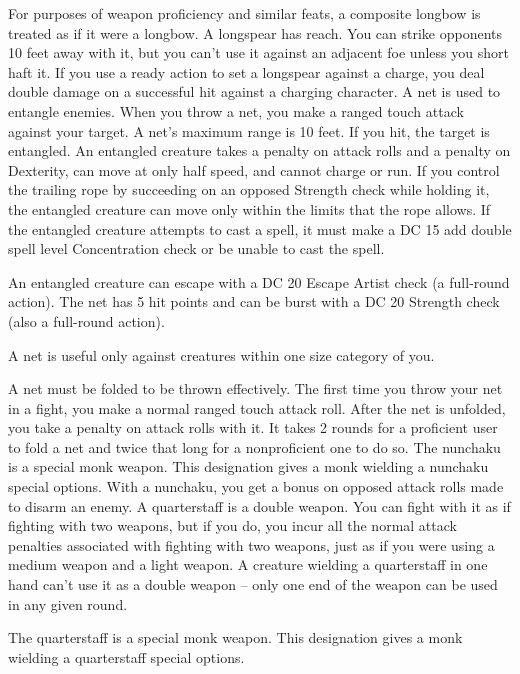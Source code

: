 \par For purposes of weapon proficiency and similar feats, a composite longbow is treated as if it were a longbow.
 A longspear has reach. You can strike opponents 10 feet away with it, but you can't use it against an adjacent foe unless you short haft it. If you use a ready action to set a longspear against a charge, you deal double damage on a successful hit against a charging character.
 A net is used to entangle enemies. When you throw a net, you make a ranged touch attack against your target. A net's maximum range is 10 feet. If you hit, the target is entangled. An entangled creature takes a  penalty on attack rolls and a  penalty on Dexterity, can move at only half speed, and cannot charge or run. If you control the trailing rope by succeeding on an opposed Strength check while holding it, the entangled creature can move only within the limits that the rope allows. If the entangled creature attempts to cast a spell, it must make a DC 15 add double spell level Concentration check or be unable to cast the spell.
\par An entangled creature can escape with a DC 20 Escape Artist check (a full-round action). The net has 5 hit points and can be burst with a DC 20 Strength check (also a full-round action).
\par A net is useful only against creatures within one size category of you.
\par A net must be folded to be thrown effectively. The first time you throw your net in a fight, you make a normal ranged touch attack roll. After the net is unfolded, you take a  penalty on attack rolls with it. It takes 2 rounds for a proficient user to fold a net and twice that long for a nonproficient one to do so.
 The nunchaku is a special monk weapon. This designation gives a monk wielding a nunchaku special options. With a nunchaku, you get a  bonus on opposed attack rolls made to disarm an enemy.
 A quarterstaff is a double weapon. You can fight with it as if fighting with two weapons, but if you do, you incur all the normal attack penalties associated with fighting with two weapons, just as if you were using a medium weapon and a light weapon. A creature wielding a quarterstaff in one hand can't use it as a double weapon -- only one end of the weapon can be used in any given round.
\par The quarterstaff is a special monk weapon. This designation gives a monk wielding a quarterstaff special options.
